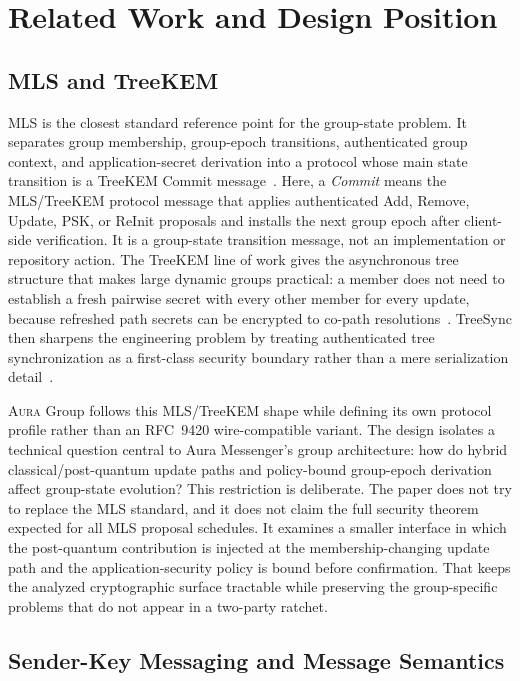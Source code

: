 \documentclass[preprint,12pt]{elsarticle}
\theoremstyle{definition}
\newcommand{\tech}[1]{\textnormal{#1}}
\newcommand{\Aura}{\textsc{Aura}}
\newcommand{\MLS}{\tech{MLS}}
\begin{document}
\section{Related Work and Design Position}\label{sec:related}

\subsection{MLS and TreeKEM}

\MLS{} is the closest standard reference point for the group-state problem.
It separates group membership, group-epoch transitions, authenticated group context,
and application-secret derivation into a protocol whose main state transition
is a TreeKEM Commit message~\cite{rfc9420}. Here, a \emph{Commit}
means the MLS/TreeKEM protocol message that applies authenticated Add, Remove,
Update, PSK, or ReInit proposals and installs the next group epoch after
client-side verification. It is a group-state transition message, not an
implementation or repository action. The TreeKEM line of work gives the
asynchronous tree structure that makes large dynamic groups practical: a
member does not need to establish a fresh pairwise secret with every other
member for every update, because refreshed path secrets can be encrypted to
co-path resolutions~\cite{treekem}. TreeSync then sharpens the engineering
problem by treating authenticated tree synchronization as a first-class
security boundary rather than a mere serialization detail~\cite{treesync}.

\Aura{} Group follows this MLS/TreeKEM shape while defining its own protocol
profile rather than an RFC~9420 wire-compatible variant. The design isolates a
technical question central to Aura Messenger's group architecture: how do
hybrid classical/post-quantum update paths and policy-bound group-epoch
derivation affect group-state evolution? This restriction is deliberate. The
paper does not try to replace the MLS standard, and it does not claim the full
security theorem expected for all MLS proposal schedules. It examines a smaller
interface in which the post-quantum contribution is injected at the
membership-changing update path and the application-security policy is bound
before confirmation. That keeps the analyzed cryptographic surface tractable
while preserving the group-specific problems that do not appear in a two-party
ratchet.

\subsection{Sender-Key Messaging and Message Semantics}
\end{document}
